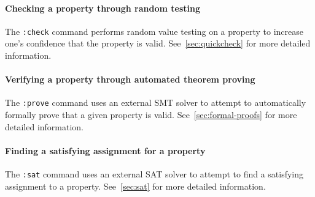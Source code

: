 \paragraph*{Checking a property through random testing}
The \texttt{:check} command performs random value testing on a
property to increase one's confidence that the property is valid.
See~\autoref{sec:quickcheck} for more detailed information.

\paragraph*{Verifying a property through automated theorem proving}
The \texttt{:prove} command uses an external SMT solver to attempt to
automatically formally prove that a given property is valid.
See~\autoref{sec:formal-proofs} for more detailed information.

\paragraph*{Finding a satisfying assignment for a property}
The \texttt{:sat} command uses an external SAT solver to attempt to
find a satisfying assignment to a property.  See~\autoref{sec:sat} for
more detailed information.




